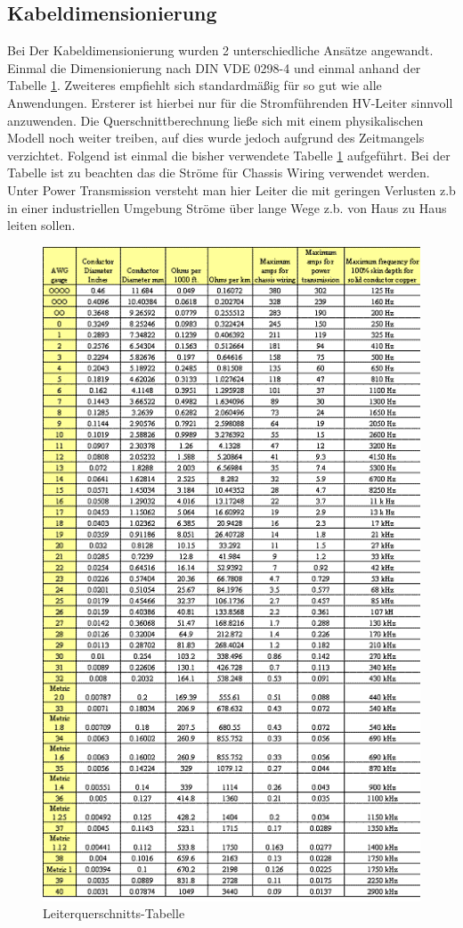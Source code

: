 \subsection{Kabeldimensionierung}
Bei Der Kabeldimensionierung wurden 2 unterschiedliche Ansätze angewandt. Einmal die Dimensionierung nach DIN VDE 0298-4 \cite{DINVDE02984} und einmal anhand der Tabelle \ref{fig:wire-thickness}. Zweiteres empfiehlt sich standardmäßig für so gut wie alle Anwendungen. Ersterer ist hierbei nur für die Stromführenden \ac{HV}-Leiter sinnvoll anzuwenden. Die Querschnittberechnung ließe sich mit einem physikalischen Modell noch weiter treiben, auf dies wurde jedoch aufgrund des Zeitmangels verzichtet.
Folgend ist einmal die bisher verwendete Tabelle \ref{fig:wire-thickness} aufgeführt.
Bei der Tabelle ist zu beachten das die Ströme für Chassis Wiring verwendet werden. Unter Power Transmission versteht man hier Leiter die mit geringen Verlusten z.b in einer industriellen Umgebung Ströme über lange Wege z.b. von Haus zu Haus leiten sollen.
\begin{figure}[h]
	\centering
	\includegraphics[width=0.7\linewidth]{"bilder/Wire thickness"}
	\caption{Leiterquerschnitts-Tabelle \cite{Technology2022}}
	\label{fig:wire-thickness}
\end{figure}


